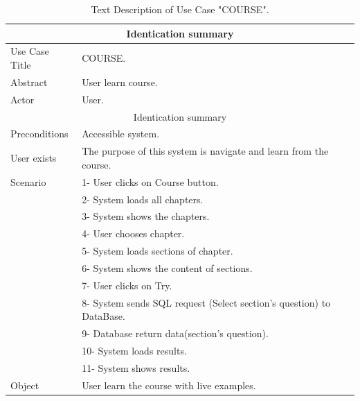 \begin{table}[h!]
	\begin{center}
		\begin{tabular}{ |p{3cm}|p{9cm}|  }
 		\hline
 		\multicolumn{2}{|c|}{Identication summary} \\
 		\hline
 		Use Case Title & COURSE. \\
 		\hline
 		Abstract   & User learn course. \\
		\hline
 		Actor&  User. \\
		\hline
		\multicolumn{2}{|c|}{Identication summary} \\
		\hline
		Preconditions & Accessible system.  \\
		\hline
		User exists    &  The purpose of this system is navigate and learn from the course. \\
		\hline
		Scenario &  1- User clicks on Course button. \\ & 2- System loads all chapters. \\ & 3- System shows the chapters. \\ & 4- User chooses chapter. \\ & 5- System loads sections of chapter. \\ & 6- System shows the content of sections. \\ & 7- User clicks on Try. \\ & 8- System sends SQL request (Select section's question) to DataBase.\\ & 9- Database return data(section's question).\\ & 10- System loads results.\\ & 11- System shows results.\\
		\hline
		Object& User learn the course with live examples.   \\
 		\hline
\end{tabular}
\end{center}
\caption{Text Description of Use Case "COURSE".}
\label{tab:DS COURSE}
\end{table}



